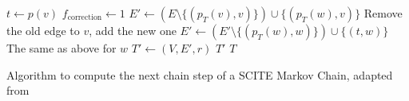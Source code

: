 \begin{algorithm}[p]
\begin{algorithmic}[1]
                \Else
                    \State $t \leftarrow p(v)$
                    \State $f_\mathrm{correction} \leftarrow 1$
                \EndIf
                \State $E' \leftarrow (E \setminus \{(p_T(v), v)\}) \cup \{(p_T(w), v)\}$ \Comment Remove the old edge to $v$, add the new one
                \State $E' \leftarrow (E' \setminus \{(p_T(w), w)\}) \cup \{(t, w)\}$ \Comment The same as above for $w$
            \EndIf
            \State $T' \leftarrow (V, E', r)$
                \State \Return $T'$
            \Else
                \State \Return $T$
            \EndIf
        \EndFunction
    \end{algorithmic}
    \caption{Algorithm to compute the next chain step of a SCITE Markov Chain, adapted from \cite{tree2016}}
    \label{alg:scite-step}
\end{algorithm}

